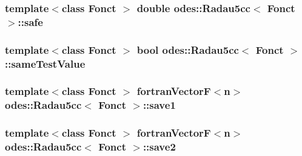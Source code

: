 \hypertarget{classodes_1_1Radau5cc_a8809fb6e400f5eaa32331a2e463f9cdb}{
\subsubsection[{safe}]{\setlength{\rightskip}{0pt plus 5cm}template$<$class Fonct $>$ double {\bf odes\-::\-Radau5cc}$<$ Fonct $>$\-::safe\hspace{0.3cm}{\ttfamily [private]}}}\label{classodes_1_1Radau5cc_a8809fb6e400f5eaa32331a2e463f9cdb}
\hypertarget{classodes_1_1Radau5cc_acab8ee5b4ea97c71a0f34bf41f145a58}{
\subsubsection[{same\-Test\-Value}]{\setlength{\rightskip}{0pt plus 5cm}template$<$class Fonct $>$ bool {\bf odes\-::\-Radau5cc}$<$ Fonct $>$\-::same\-Test\-Value\hspace{0.3cm}{\ttfamily [private]}}}\label{classodes_1_1Radau5cc_acab8ee5b4ea97c71a0f34bf41f145a58}
\hypertarget{classodes_1_1Radau5cc_a2d4840f821ba5e059d73ca63a002aca1}{
\subsubsection[{save1}]{\setlength{\rightskip}{0pt plus 5cm}template$<$class Fonct $>$ {\bf fortran\-Vector\-F}$<${\bf n}$>$ {\bf odes\-::\-Radau5cc}$<$ Fonct $>$\-::save1\hspace{0.3cm}{\ttfamily [private]}}}\label{classodes_1_1Radau5cc_a2d4840f821ba5e059d73ca63a002aca1}
\hypertarget{classodes_1_1Radau5cc_a8928e81eefe11977cd13856b65048dac}{
\subsubsection[{save2}]{\setlength{\rightskip}{0pt plus 5cm}template$<$class Fonct $>$ {\bf fortran\-Vector\-F}$<${\bf n}$>$ {\bf odes\-::\-Radau5cc}$<$ Fonct $>$\-::save2\hspace{0.3cm}{\ttfamily [private]}}}\label{classodes_1_1Radau5cc_a8928e81eefe11977cd13856b65048dac}
